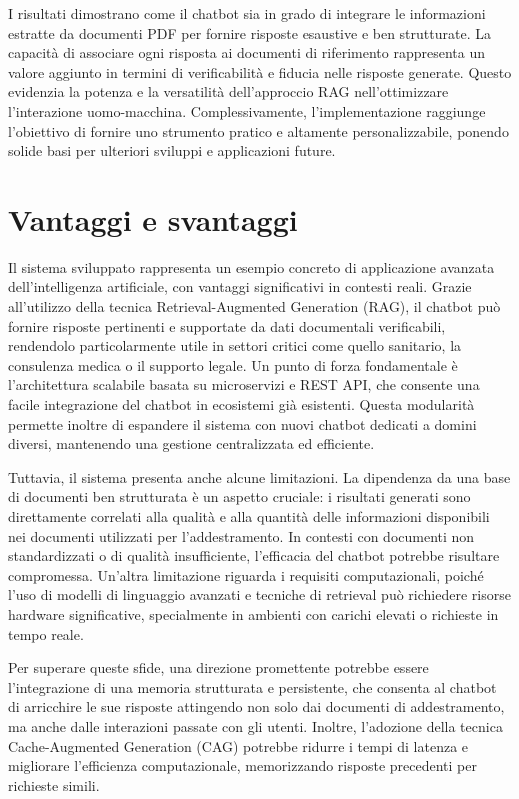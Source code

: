 \documentclass[a4paper,twoside,12pt]{toptesi}
\begin{document}
I risultati dimostrano come il chatbot sia in grado di integrare le informazioni estratte da documenti PDF per fornire risposte esaustive e ben strutturate. La capacità di associare ogni risposta ai documenti di riferimento rappresenta un valore aggiunto in termini di verificabilità e fiducia nelle risposte generate. Questo evidenzia la potenza e la versatilità dell'approccio RAG nell'ottimizzare l'interazione uomo-macchina. Complessivamente, l'implementazione raggiunge l'obiettivo di fornire uno strumento pratico e altamente personalizzabile, ponendo solide basi per ulteriori sviluppi e applicazioni future.

\section{Vantaggi e svantaggi}
Il sistema sviluppato rappresenta un esempio concreto di applicazione avanzata dell'intelligenza artificiale, con vantaggi significativi in contesti reali. Grazie all'utilizzo della tecnica Retrieval-Augmented Generation (RAG), il chatbot può fornire risposte pertinenti e supportate da dati documentali verificabili, rendendolo particolarmente utile in settori critici come quello sanitario, la consulenza medica o il supporto legale. Un punto di forza fondamentale è l'architettura scalabile basata su microservizi e REST API, che consente una facile integrazione del chatbot in ecosistemi già esistenti. Questa modularità permette inoltre di espandere il sistema con nuovi chatbot dedicati a domini diversi, mantenendo una gestione centralizzata ed efficiente.

Tuttavia, il sistema presenta anche alcune limitazioni. La dipendenza da una base di documenti ben strutturata è un aspetto cruciale: i risultati generati sono direttamente correlati alla qualità e alla quantità delle informazioni disponibili nei documenti utilizzati per l'addestramento. In contesti con documenti non standardizzati o di qualità insufficiente, l'efficacia del chatbot potrebbe risultare compromessa. Un'altra limitazione riguarda i requisiti computazionali, poiché l'uso di modelli di linguaggio avanzati e tecniche di retrieval può richiedere risorse hardware significative, specialmente in ambienti con carichi elevati o richieste in tempo reale.

Per superare queste sfide, una direzione promettente potrebbe essere l'integrazione di una memoria strutturata e persistente, che consenta al chatbot di arricchire le sue risposte attingendo non solo dai documenti di addestramento, ma anche dalle interazioni passate con gli utenti. Inoltre, l'adozione della tecnica Cache-Augmented Generation (CAG) potrebbe ridurre i tempi di latenza e migliorare l'efficienza computazionale, memorizzando risposte precedenti per richieste simili.
\end{document}

